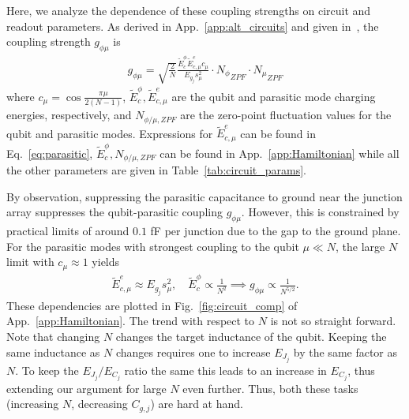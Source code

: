 \documentclass[%
reprint,
superscriptaddress,
 amsmath,amssymb,
 aps,
 prx,
longbibliography,
floatfix,
]{revtex4-2}
\begin{document}
Here, we analyze the dependence of these coupling strengths on circuit and readout parameters. As derived in App.~\ref{app:alt_circuits} and given in~\cite{viola2015collective}, the coupling strength $g_{\phi \mu}$ is
\begin{align}
g_{\phi\mu}=\sqrt{\frac{2}{N}} \frac{\tilde{E}^\phi_c\tilde{E}^e_{c,\mu}c_\mu}{E_{g_j}s_\mu^2}     \cdot {N_\phi}_{ZPF} \cdot {N_\mu}_{ZPF}
\end{align}
where $c_\mu=\cos{\frac{\pi\mu}{2(N-1)}}$, $\tilde{E}_c^\phi,\tilde{E}^e_{c,\mu} $ are the qubit and parasitic mode charging energies, respectively, and $N_{\phi/\mu,ZPF}$ are the zero-point fluctuation values for the qubit and parasitic modes. Expressions for $\tilde{E}^e_{c,\mu}$ can be found in Eq.~\ref{eq:parasitic}, $\tilde{E}_c^\phi,N_{\phi/\mu,ZPF}$ can be found in App.~\ref{app:Hamiltonian} while all the other parameters are given in Table~\ref{tab:circuit_params}. 

By observation, suppressing the parasitic capacitance to ground near the junction array suppresses the qubit-parasitic coupling $g_{\phi\mu}$. However, this is constrained by practical limits of around $0.1$ fF per junction due to the gap to the ground plane. For the parasitic modes with strongest coupling to the qubit $\mu\ll N$, the large $N$ limit with $c_\mu\approx 1$ yields
\begin{align}
    \tilde{E}^e_{c,\mu}\approx E_{g_j}s_\mu^2, \quad \tilde{E}^\phi_c\propto \frac{1}{N^2}\implies g_{\phi\mu}\propto \frac{1}{N^{5/2}}.
\end{align}
 These dependencies are plotted in Fig.~\ref{fig:circuit_comp} of App.~\ref{app:Hamiltonian}. The trend with respect to $N$ is not so straight forward.  Note that changing $N$ changes the target inductance of the qubit. Keeping the same inductance as $N$ changes requires one to increase $E_{J_j}$ by the same factor as $N$. To keep the $E_{J_j}/E_{C_j}$ ratio the same this leads to an increase in $E_{C_j}$, thus extending our argument for large $N$ even further. Thus, both these tasks (increasing $N$, decreasing $C_{g,j}$) are hard at hand.  
\end{document}
